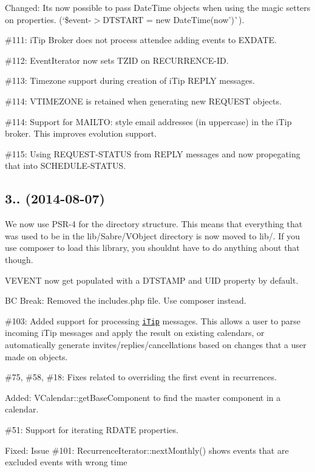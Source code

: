 \begin{DoxyItemize}
\item Changed\+: It\textquotesingle{}s now possible to pass Date\+Time objects when using the magic setters on properties. (`\$event-\/$>$D\+T\+S\+T\+A\+RT = new Date\+Time(\textquotesingle{}now')\`{}).
\item \#111\+: i\+Tip Broker does not process attendee adding events to E\+X\+D\+A\+TE.
\item \#112\+: Event\+Iterator now sets T\+Z\+ID on R\+E\+C\+U\+R\+R\+E\+N\+C\+E-\/\+ID.
\item \#113\+: Timezone support during creation of i\+Tip R\+E\+P\+LY messages.
\item \#114\+: V\+T\+I\+M\+E\+Z\+O\+NE is retained when generating new R\+E\+Q\+U\+E\+ST objects.
\item \#114\+: Support for \textquotesingle{}M\+A\+I\+L\+TO\+:\textquotesingle{} style email addresses (in uppercase) in the i\+Tip broker. This improves evolution support.
\item \#115\+: Using R\+E\+Q\+U\+E\+S\+T-\/\+S\+T\+A\+T\+US from R\+E\+P\+LY messages and now propegating that into S\+C\+H\+E\+D\+U\+L\+E-\/\+S\+T\+A\+T\+US.
\end{DoxyItemize}

\subsection*{3.. (2014-\/08-\/07) }


\begin{DoxyItemize}
\item We now use P\+S\+R-\/4 for the directory structure. This means that everything that was used to be in the {\ttfamily lib/\+Sabre/\+V\+Object} directory is now moved to {\ttfamily lib/}. If you use composer to load this library, you shouldn\textquotesingle{}t have to do anything about that though.
\item V\+E\+V\+E\+NT now get populated with a D\+T\+S\+T\+A\+MP and U\+ID property by default.
\item BC Break\+: Removed the \textquotesingle{}includes.\+php\textquotesingle{} file. Use composer instead.
\item \#103\+: Added support for processing \href{http://tools.ietf.org/html/rfc5546}{\tt i\+Tip} messages. This allows a user to parse incoming i\+Tip messages and apply the result on existing calendars, or automatically generate invites/replies/cancellations based on changes that a user made on objects.
\item \#75, \#58, \#18\+: Fixes related to overriding the first event in recurrences.
\item Added\+: V\+Calendar\+::get\+Base\+Component to find the \textquotesingle{}master\textquotesingle{} component in a calendar.
\item \#51\+: Support for iterating R\+D\+A\+TE properties.
\item Fixed\+: Issue \#101\+: Recurrence\+Iterator\+::next\+Monthly() shows events that are excluded events with wrong time
\end{DoxyItemize}

